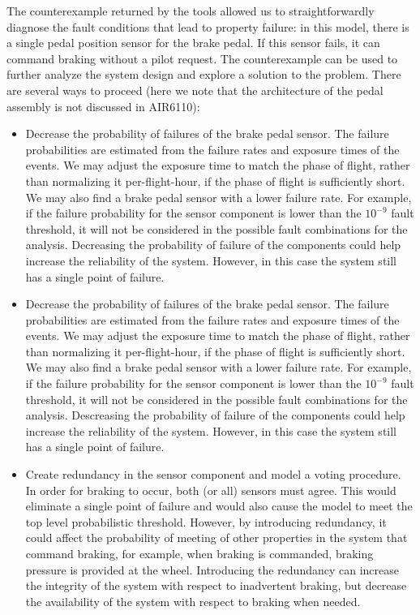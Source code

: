 The counterexample returned by the tools allowed us to straightforwardly diagnose the fault conditions that lead to property failure: in this model, there is a single pedal position sensor for the brake pedal. If this sensor fails, it can command braking without a pilot request. The counterexample can be used to further analyze the system design and explore a solution to the problem. There are several ways to proceed (here we note that the architecture of the pedal assembly is not discussed in AIR6110):
	\begin{itemize}
	\renewcommand{\labelitemi}{\textbullet}
	\item Decrease the probability of failures of the brake pedal sensor. The failure probabilities are estimated from the failure rates and exposure times of the events. We may adjust the exposure time to match the phase of flight, rather than normalizing it per-flight-hour, if the phase of flight is sufficiently short. We may also find a brake pedal sensor with a lower failure rate. For example, if the failure probability for the sensor component is lower than the $10^{-9}$ fault threshold, it will not be considered in the possible fault combinations for the analysis. Decreasing the probability of failure of the components could help increase the reliability of the system. However, in this case the system still has a single point of failure.

	\item Decrease the probability of failures of the brake pedal sensor. The failure probabilities are estimated from the failure rates and exposure times of the events. We may adjust the exposure time to match the phase of flight, rather than normalizing it per-flight-hour, if the phase of flight is sufficiently short. We may also find a brake pedal sensor with a lower failure rate. For example, if the failure probability for the sensor component is lower than the $10^{-9}$ fault threshold, it will not be considered in the possible fault combinations for the analysis. Descreasing the probability of failure of the components could help increase the reliability of the system. However, in this case the system still has a single point of failure.
	
	\item Create redundancy in the sensor component and model a voting procedure.
	In order for braking to occur, both (or all) sensors must agree. This would eliminate a single point of failure and would also cause the model to meet the top level probabilistic threshold. However, by introducing redundancy, it could affect the probability of meeting of other properties in the system that command braking, for example, when braking is commanded, braking pressure is provided at the wheel. Introducing the redundancy can increase the integrity of the system with respect to inadvertent braking, but decrease the availability of the system with respect to braking when needed.
\end{itemize}

